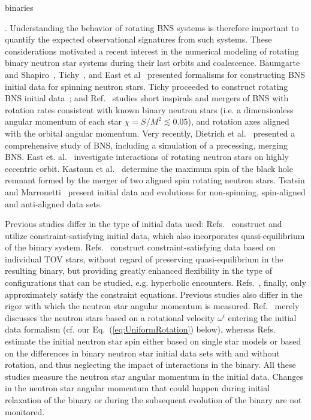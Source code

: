binaries~{\cite{metzger:11}. 
Understanding the behavior of rotating BNS systems is therefore important to quantify the expected observational signatures from such systems.
These considerations motivated a recent interest in the numerical
modeling of rotating binary neutron star systems during their last
orbits and coalescence.  Baumgarte and
Shapiro~\cite{Baumgarte:2009fw}, Tichy~\cite{Tichy:2011gw}, and East
et al~\cite{East:2012zn} presented formalisms for constructing BNS
initial data for spinning neutron stars.  Tichy proceeded to construct
rotating BNS initial data~\cite{Tichy:2012rp}; and
Ref.~\cite{Bernuzzi:2013rza} studies short inspirals and mergers of
BNS with rotation rates consistent with known binary neutron stars
(i.e. a dimensionless angular momentum of each star
$\chi=S/M^2\lesssim 0.05$), and rotation axes aligned with the orbital
angular momentum.  Very recently, Dietrich et al.~\cite{Dietrich:2015pxa} presented a comprehensive study of BNS, including a simulation of a precessing, merging BNS.
East et. al.~\cite{East:2015yea} investigate
interactions of rotating neutron stars on highly eccentric orbit.
Kastaun et al.~\cite{Kastaun:2013mv} determine the maximum spin of the
black hole remnant formed by the merger of two aligned spin rotating
neutron stars.  Tsatsin and Marronetti~\cite{Tsatsin:2013jca} present
initial data and evolutions for non-spinning, spin-aligned and
anti-aligned data sets. 

Previous studies differ in the type of initial data used:
Refs.~\cite{Baumgarte:2009fw,Tichy:2011gw,Tichy:2012rp,Bernuzzi:2013rza}
construct and utilize constraint-satisfying initial data, which also
incorporates quasi-equilibrium of the binary system.
Refs.~\cite{East:2012zn,East:2015yea} construct constraint-satisfying
data based on individual TOV stars, without regard of preserving
quasi-equilibrium in the resulting binary, but providing greatly
enhanced flexibility in the type of configurations that can be
studied, e.g. hyperbolic encounters.
Refs.~\cite{Kastaun:2013mv,Tsatsin:2013jca}, finally, only
approximately satisfy the constraint equations.
Previous studies also
differ in the rigor with which the neutron star angular momentum is
measured.  Ref.~\cite{Tichy:2012rp} merely discusses the neutron stars
based on a rotational velocity $\omega^i$ entering the initial data
formalism (cf. our Eq.~(\ref{eq:UniformRotation}) below), whereas
Refs.~\cite{Bernuzzi:2013rza,Kastaun:2013mv,East:2015yea} estimate the
initial neutron star spin either based on single star models or based
on the differences in binary neutron star initial data sets with and
without rotation, and thus neglecting the impact of interactions in
the binary.  All these studies measure the neutron star angular
momentum in the initial data.  Changes in the neutron star angular
momentum that could happen during initial
relaxation of the binary or during the subsequent evolution of the
binary are not monitored.

}
